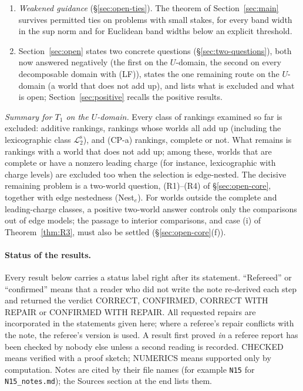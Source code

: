 \documentclass[11pt]{article}
\theoremstyle{definition}
\theoremstyle{remark}
\newcommand{\src}[1]{\texttt{#1}}
\newcommand{\Ltwo}{\mathcal L_2^{\mathrm s}}
\begin{document}
\begin{enumerate}[leftmargin=*]
\item \emph{Weakened guidance} (\S\ref{sec:open-ties}). The theorem of Section~\ref{sec:main} survives permitted ties on problems with small stakes, for every band width in the sup norm and for Euclidean band widths below an explicit threshold.
\item Section~\ref{sec:open} states two concrete questions (\S\ref{sec:two-questions}), both now answered negatively (the first on the $U$-domain, the second on every decomposable domain with (LF)), states the one remaining route on the $U$-domain (a world that does not add up), and lists what is excluded and what is open; Section~\ref{sec:positive} recalls the positive results.
\end{enumerate}
\emph{Summary for $T_1$ on the $U$-domain.} Every class of rankings examined so far is excluded: additive rankings, rankings whose worlds all add up (including the lexicographic class $\Ltwo$), and (CP-a) rankings, complete or not. What remains is rankings with a world that does not add up; among these, worlds that are complete or have a nonzero leading charge (for instance, lexicographic with charge levels) are excluded too when the selection is edge-nested. The decisive remaining problem is a two-world question, (R1)--(R4) of \S\ref{sec:open-core}, together with edge nestedness (Nest$_e$). For worlds outside the complete and leading-charge classes, a positive two-world answer controls only the comparisons out of edge models; the passage to interior comparisons, and case (i) of Theorem~\ref{thm:R3}, must also be settled (\S\ref{sec:open-core}(f)).

\paragraph{Status of the results.}
Every result below carries a status label right after its statement. ``Refereed'' or ``confirmed'' means that a reader who did not write the note re-derived each step and returned the verdict CORRECT, CONFIRMED, CORRECT WITH REPAIR or CONFIRMED WITH REPAIR. All requested repairs are incorporated in the statements given here; where a referee's repair conflicts with the note, the referee's version is used. A result first proved \emph{in} a referee report has been checked by nobody else unless a second reading is recorded. CHECKED means verified with a proof sketch; NUMERICS means supported only by computation. Notes are cited by their file names (for example \src{N15} for \src{N15\_notes.md}); the Sources section at the end lists them.
\end{document}
